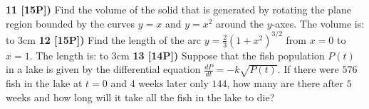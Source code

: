 \documentclass[12pt]{article}
\begin{document}
\newpage
{\bf 11 [15P])} Find the volume of the solid that is generated
by rotating the plane region bounded
by the curves  $\displaystyle{y= x}$ and
${\displaystyle y =  x^2}$  around the $y$-axes.
The volume is: \hbox  to 3cm{\hrulefill} 
{\bf 12 [15P])} Find the length of the arc
$\displaystyle{y = \frac{2}{3}\left(1 + x^2\right)^{3/2}}$
from $\displaystyle{x=0}$ to $\displaystyle{x = 1}$.
The length is: \hbox  to 3cm{\hrulefill}
{\bf 13 [14P])} Suppose that the fish population $P(t)$ in a
lake is given by the differential equation
${\displaystyle \frac{dP}{dt} = - k\sqrt{P(t)}}$. If
there were $576$ fish in the lake at $t=0$ and
$4$ weeks later only
$144$, how many are there after $5$ weeks and how long will it
take all the fish in the lake to die?
\end{document}
